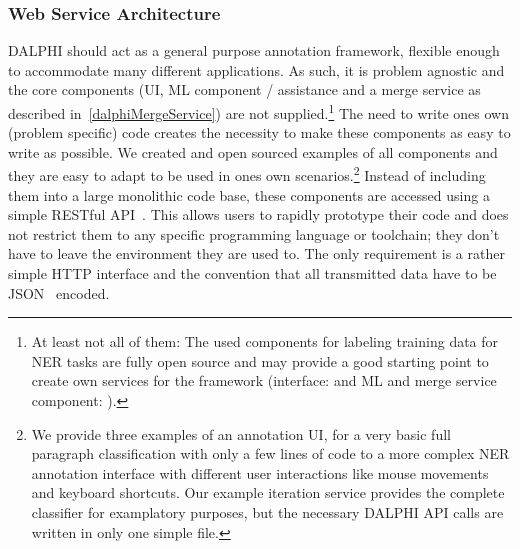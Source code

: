 	\subsubsection{Web Service Architecture}
		\label{sec:implementationWSA}
		\ac{DALPHI} should act as a general purpose annotation framework, flexible enough to accommodate many different applications. As such, it is problem agnostic and the core components (\ac{UI}, \ac{ML} component / assistance and a merge service as described in~\ref{dalphiMergeService}) are not supplied.\footnote{At least not all of them: The used components for labeling training data for \ac{NER} tasks are fully open source and may provide a good starting point to create own services for the framework (interface:  and \ac{ML} and merge service component: ).}
		The need to write ones own (problem specific) code creates the necessity to make these components as easy to write as possible. We created and open sourced examples of all components and they are easy to adapt to be used in ones own scenarios.\footnote{We provide three examples of an annotation \ac{UI}, for a very basic full paragraph classification with only a few lines of code to a more complex \ac{NER} annotation interface with different user interactions like mouse movements and keyboard shortcuts. Our example iteration service provides the complete classifier for examplatory purposes, but the necessary \ac{DALPHI} \ac{API} calls are written in only one simple file.}
		Instead of including them into a large monolithic code base, these components are accessed using a simple RESTful \ac{API}~\cite{w3crestarch}. This allows users to rapidly prototype their code and does not restrict them to any specific programming language or toolchain; they don't have to leave the environment they are used to. The only requirement is a rather simple HTTP interface and the convention that all transmitted data have to be \ac{JSON}~\cite{bray2014javascript} encoded.

